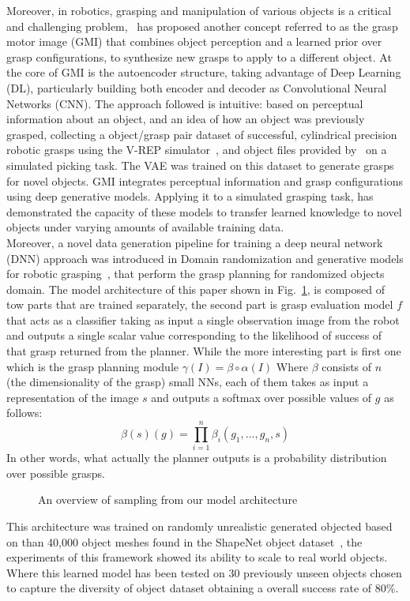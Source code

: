 Moreover, in robotics, grasping and manipulation of various objects is a critical and challenging problem,~\cite{veres2017modeling} has proposed another concept referred to as the grasp motor image (GMI) that combines object perception and a learned prior over grasp configurations, to synthesize new grasps to apply to a different object. At the core of GMI is the autoencoder structure, taking advantage of Deep  Learning (DL), particularly building both encoder and decoder as Convolutional Neural Networks (CNN). The approach followed is intuitive: based on
perceptual information about an object, and an idea of how an object was previously grasped, collecting a object/grasp pair dataset of successful, cylindrical precision robotic grasps using the V-REP  simulator~\cite{rohmer2013v}, and object files provided by~\cite{kleinhans2015g3db} on a simulated picking task. The VAE was trained on this dataset to generate grasps for novel objects. GMI integrates
perceptual information and grasp configurations using deep generative models. Applying it to a simulated grasping task, has demonstrated the capacity of these models to transfer learned knowledge to novel objects under varying amounts of available training data.\\

Moreover, a novel data generation pipeline for
training a deep neural network (DNN) approach was introduced in Domain randomization and generative models for robotic grasping~\cite{tobin2018domain}, that perform the grasp planning for randomized objects domain. The model architecture of this paper shown in Fig.~\ref{fig:DomainRand}, is composed of tow parts that are trained separately, the second part is grasp evaluation model $f$ that acts as a classifier taking as input a single observation image from the robot and outputs a single scalar value corresponding to the likelihood of success of that grasp returned from the planner. While the more interesting part is first one which is the grasp planning module $\gamma(I) = \beta \circ \alpha(I)$ Where $\beta$ consists of $n$ (the dimensionality of the grasp) small NNs, each of them takes as input a representation of the image $s$ and outputs a softmax over possible values of $g$ as follows:
\begin{equation}
\beta(s)(g) = \displaystyle \prod_{i=1}^{n}\beta_i(g_1,...,g_n,s)
\end{equation}
In other words, what actually the planner outputs is a probability distribution over possible grasps.

\begin{figure}
	\centerline
	\DomainRand
	\caption{An overview of sampling from our model architecture}
	\label{fig:DomainRand}
\end{figure} 
This architecture was trained on randomly unrealistic generated objected based on than 40,000 object meshes found in the ShapeNet object dataset~\cite{chang2015shapenet}, the experiments of this framework showed its ability to scale to real world objects. Where this learned model has been tested on 30 previously unseen objects chosen to capture the diversity of object dataset obtaining a overall success rate of 80\%.


